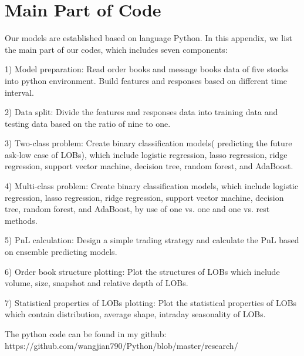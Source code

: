 \chapter{Main Part of Code}
Our models are established based on language Python. In this appendix, we list the main part of our codes, which includes seven components:

1) Model preparation: Read order books and message books data of five stocks into python environment. Build features and responses based on different time interval.

2) Data split: Divide the features and responses data into training data and testing data based on the ratio of nine to one.

3) Two-class problem: Create binary classification models( predicting the future ask-low case of LOBs), which include logistic regression, lasso regression, ridge regression, support vector machine, decision tree, random forest, and AdaBoost.

4) Multi-class problem: Create binary classification models, which include logistic regression, lasso regression, ridge regression, support vector machine, decision tree, random forest, and AdaBoost, by use of one vs. one and one vs. rest methods.

5) PnL calculation: Design a simple trading strategy and calculate the PnL based on ensemble predicting models.

6) Order book structure plotting: Plot the structures of LOBs which include volume, size, snapshot and relative depth of LOBs.

7) Statistical properties of LOBs plotting: Plot the statistical properties of LOBs which contain distribution, average shape, intraday seasonality of LOBs.

The python code can be found in my github:\\
https://github.com/wangjian790/Python/blob/master/research/
% 